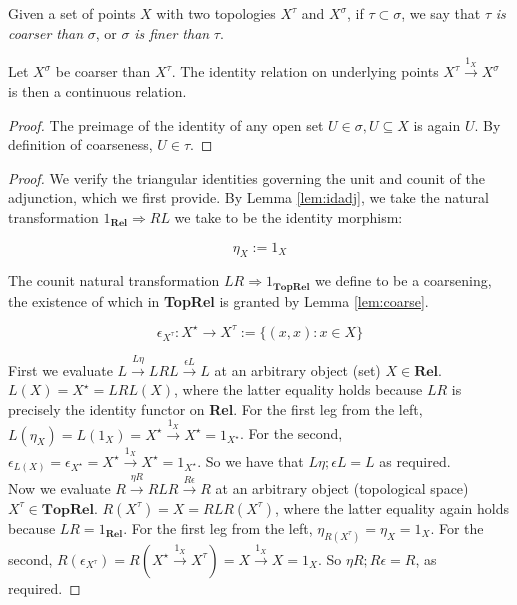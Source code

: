 \begin{fullwidth}
\begin{rem}
Given a set of points $X$ with two topologies $X^\tau$ and $X^\sigma$, if $\tau \subset \sigma$, we say that $\tau$ \emph{is coarser than} $\sigma$, or $\sigma$ \emph{is finer than} $\tau$.
\end{rem}

\begin{lemma}\label{lem:coarse}
Let $X^\sigma$ be coarser than $X^\tau$. The identity relation on underlying points $X^\tau \overset{1_X}{\rightarrow} X^\sigma$ is then a continuous relation.
\begin{proof}
The preimage of the identity of any open set $U \in \sigma, U \subseteq X$ is again $U$. By definition of coarseness, $U \in \tau$.
\end{proof}
\end{lemma}

\begin{proposition}[$L \dashv R$]\label{prop:reladj}
\begin{proof}
We verify the triangular identities governing the unit and counit of the adjunction, which we first provide. By Lemma \ref{lem:idadj}, we take the natural transformation $1_\mathbf{Rel} \Rightarrow RL$ we take to be the identity morphism:

\[\eta_{X} := 1_{X}\]

The counit natural transformation $LR \Rightarrow 1_{\mathbf{TopRel}}$ we define to be a coarsening, the existence of which in \textbf{TopRel} is granted by Lemma \ref{lem:coarse}.

\[\epsilon_{X^\tau} : X^\star \rightarrow X^\tau := \{(x,x) : x \in X\}\]

First we evaluate $L \overset{L\eta}{\rightarrow} LRL \overset{\epsilon L}{\rightarrow} L$ at an arbitrary object (set) $X \in \textbf{Rel}$. $L(X) = X^\star = LRL(X)$, where the latter equality holds because $LR$ is precisely the identity functor on \textbf{Rel}. For the first leg from the left, $L(\eta_X) = L(1_X) = X^\star \overset{1_X}{\rightarrow} X^\star = 1_{X^\star}$. For the second, $\epsilon_{L(X)} = \epsilon_{X^\star} = X^\star \overset{1_X}{\rightarrow} X^\star = 1_{X^\star}$. So we have that $L\eta ; \epsilon L = L$ as required.\\

Now we evaluate $R \overset{\eta R}{\rightarrow} RLR \overset{R \epsilon}{\rightarrow} R$ at an arbitrary object (topological space) $X^\tau \in \textbf{TopRel}$. $R(X^\tau) = X = RLR(X^\tau)$, where the latter equality again holds because $LR = 1_\textbf{Rel}$. For the first leg from the left, $\eta_{R(X^\tau)} = \eta_X = 1_{X}$. For the second, $R(\epsilon_{X^\tau}) = R(X^\star \overset{1_X}{\rightarrow} X^\tau) = X \overset{1_X}{\rightarrow} X = 1_X$. So $\eta R ; R \epsilon = R$, as required.
\end{proof}
\end{proposition}


\end{fullwidth}
